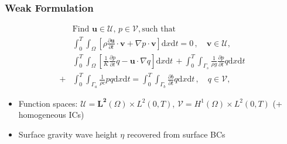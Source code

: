 \begin{frame}
    \frametitle{Weak Formulation}
    \[
    \begin{aligned}
    &\text{Find }
    \boldsymbol{u} \in \mathcal{U},\, p \in \mathcal{V}, \text{such that} \\
    &\int_0^T \! \! \! \int_\Omega
    \left[ \rho\frac{\partial \boldsymbol{u}}{\partial{t}} \cdot \boldsymbol{v} +
    \nabla p \cdot \boldsymbol{v} \right] \text{d} x \text{d} t
    = 0 \, , \quad
    \boldsymbol{v} \in \mathcal{U}, \\
    &\int_0^T \! \! \! \int_\Omega
    \left[ \frac{1}{K}\frac{\partial p}{\partial t} q - \boldsymbol{u} \cdot \nabla{q} \right] \text{d}
    x \text{d} t \,
    +\int_0^T \! \! \! \int_{\Gamma_s}
    \frac{1}{\rho g} \frac{\partial p}{\partial t} q
    \text{d} x \text{d} t
    \\
    +&\int_0^T \! \! \! \int_{\Gamma_a}
    \frac{1}{\rho c} p q
    \text{d} x \text{d} t
    =
    \int_0^T \! \! \! \int_{\Gamma_b}
    \frac{\partial b}{\partial t} q
    \text{d} x \text{d} t
    \, , \quad
    q \in \mathcal{V},
    \end{aligned}
    \]
    \begin{itemize}
        \item Function spaces: \(\mathcal{U} = \boldsymbol{L^2}(\Omega) \times L^2(0,T)\), \(\mathcal{V} = H^1(\Omega) \times L^2(0,T)\) (+ homogeneous ICs)
        \item Surface gravity wave height \(\eta\) recovered from surface BCs
    \end{itemize}
\end{frame}


